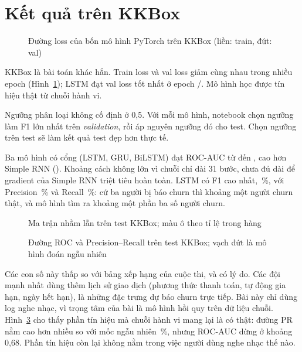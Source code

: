 \section{Kết quả trên KKBox}

\begin{figure}[H]
  \centering
  \caption{Đường loss của bốn mô hình PyTorch trên KKBox (liền: train, đứt: val)}
  \label{fig:loss-kkbox}
\end{figure}

KKBox là bài toán khác hẳn. Train loss và val loss giảm cùng nhau trong nhiều epoch (Hình~\ref{fig:loss-kkbox}); LSTM
đạt val loss tốt nhất ở epoch /. Mô hình
học được tín hiệu thật từ chuỗi hành vi.

Ngưỡng phân loại không cố định ở 0,5. Với mỗi mô hình, notebook chọn ngưỡng làm F1 lớn nhất trên \emph{validation},
rồi áp nguyên ngưỡng đó cho test. Chọn ngưỡng trên test sẽ làm kết quả test đẹp hơn thực tế.


\begin{table}[H]
  \centering\footnotesize
  \caption{Bốn mô hình PyTorch trên tập test KKBox ( người dùng)}
  \label{tab:torch-kkbox}
  
\end{table}

Ba mô hình có cổng (LSTM, GRU, BiLSTM) đạt ROC-AUC từ  đến
, cao hơn Simple RNN (). Khoảng cách không lớn
vì chuỗi chỉ dài 31 bước, chưa đủ dài để gradient của Simple RNN triệt tiêu hoàn toàn. LSTM có F1 cao nhất,
\,\%, với Precision \,\% và Recall
\,\%: cứ ba người bị báo churn thì khoảng một người churn thật, và mô hình tìm ra
khoảng một phần ba số người churn.

\begin{figure}[H]
  \centering
  \caption{Ma trận nhầm lẫn trên test KKBox; màu ô theo tỉ lệ trong hàng}
  \label{fig:conf-kkbox}
\end{figure}

\begin{figure}[H]
  \centering
  \caption{Đường ROC và Precision--Recall trên test KKBox; vạch đứt là mô hình đoán ngẫu nhiên}
  \label{fig:roc-pr}
\end{figure}

Các con số này thấp so với bảng xếp hạng của cuộc thi, và có lý do. Các đội mạnh nhất dùng thêm lịch sử giao dịch (phương
thức thanh toán, tự động gia hạn, ngày hết hạn), là những đặc trưng dự báo churn trực tiếp. Bài này chỉ dùng log nghe
nhạc, vì trọng tâm của bài là mô hình hồi quy trên dữ liệu chuỗi. Hình~\ref{fig:roc-pr} cho thấy phần tín hiệu mà chuỗi hành vi
mang lại là có thật: đường PR nằm cao hơn nhiều so với mốc ngẫu nhiên \,\%, nhưng
ROC-AUC dừng ở khoảng 0,68. Phần tín hiệu còn lại không nằm trong việc người dùng nghe nhạc thế nào.
